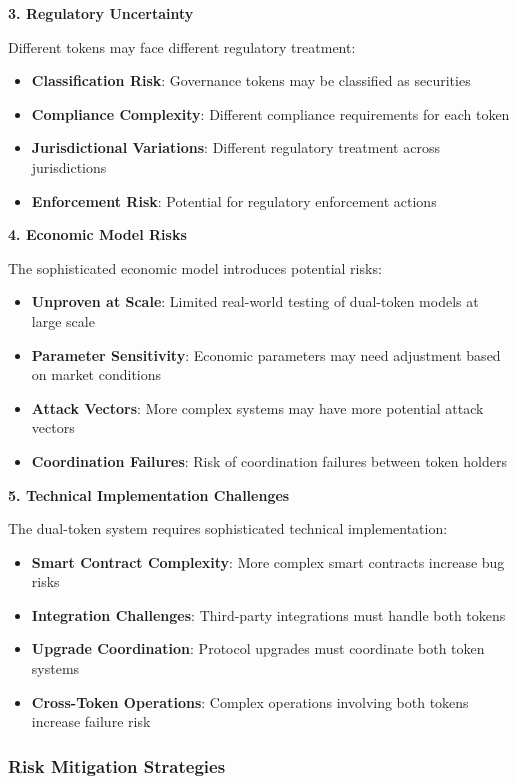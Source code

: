 \documentclass[12pt,a4paper]{article}
\begin{document}
\textbf{3. Regulatory Uncertainty}

Different tokens may face different regulatory treatment:

\begin{itemize}
\item \textbf{Classification Risk}: Governance tokens may be classified as securities
\item \textbf{Compliance Complexity}: Different compliance requirements for each token
\item \textbf{Jurisdictional Variations}: Different regulatory treatment across jurisdictions
\item \textbf{Enforcement Risk}: Potential for regulatory enforcement actions
\end{itemize}

\textbf{4. Economic Model Risks}

The sophisticated economic model introduces potential risks:

\begin{itemize}
\item \textbf{Unproven at Scale}: Limited real-world testing of dual-token models at large scale
\item \textbf{Parameter Sensitivity}: Economic parameters may need adjustment based on market conditions
\item \textbf{Attack Vectors}: More complex systems may have more potential attack vectors
\item \textbf{Coordination Failures}: Risk of coordination failures between token holders
\end{itemize}

\textbf{5. Technical Implementation Challenges}

The dual-token system requires sophisticated technical implementation:

\begin{itemize}
\item \textbf{Smart Contract Complexity}: More complex smart contracts increase bug risks
\item \textbf{Integration Challenges}: Third-party integrations must handle both tokens
\item \textbf{Upgrade Coordination}: Protocol upgrades must coordinate both token systems
\item \textbf{Cross-Token Operations}: Complex operations involving both tokens increase failure risk
\end{itemize}

\subsubsection{Risk Mitigation Strategies}
\end{document}
